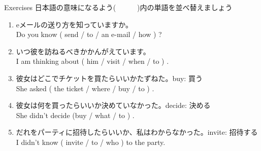 \documentclass[aspectratio=169,xcolor={dvipsnames,table}]{beamer}
\begin{document}
\begin{frame}[plain]{Exercises}
日本語の意味になるよう(~~~~~~)内の単語を並べ替えましょう

 \begin{enumerate}
  \item eメールの送り方を知っていますか。\\%
	Do you know ( send / to / an e-mail / how ) ?\hfill{}
	\visible<2->{\textcolor{BurntOrange}{\bfseries how to send an e-mail}}
  \item いつ彼を訪ねるべきかかんがえています。\\
	I am thinking about ( him / visit / when / to ) .\hfill{}
	\visible<3->{\textcolor{BurntOrange}{\bfseries when to visit him}}
  \item 彼女はどこでチケットを買たらいいかたずねた。\hfill{\scriptsize buy: 買う}\\
	She asked ( the ticket / where / buy / to  ) .\hfill{}
	\\
  \item 彼女は何を買ったらいいか決めていなかった。\hfill{\scriptsize decide: 決める}\\
	She didn't decide (buy / what / to ) .
	\hfill\visible<5->{\textcolor{BurntOrange}{\bfseries what to buy}}
  \item だれをパーティに招待したらいいか、私はわからなかった。\hfill{\scriptsize invite: 招待する}\\
	I didn't know ( invite / to / who ) to the party.\hfill{}
	\visible<6->{\textcolor{BurntOrange}{\bfseries who to invite}}
 \end{enumerate}
\end{frame}
\end{document}
